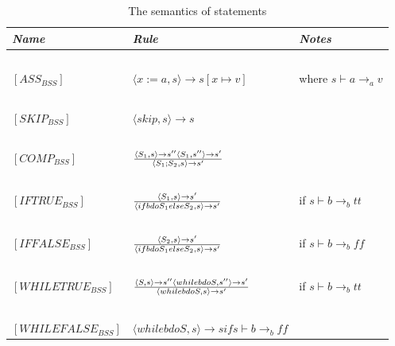 \begin{table}[h]
	\begin{tabular}{|l|l|l|}
	\hline
	\emph{Name}			& \emph{Rule}																															& \emph{Notes} \\ \hline
			~			&															~																			& ~ \\
	$[ASS_{BSS}]$		& $\langle x := a,s \rangle \rightarrow s[x \mapsto v]$																					& where $s \vdash a \rightarrow_{a} v$ \\
			~			&															~																			& ~ \\
	$[SKIP_{BSS}]$		& $\langle skip, s \rangle \rightarrow s$																								& ~ \\
			~			&															~																			& ~ \\
	$[COMP_{BSS}]$		& $\langle S_{1},s \rangle \rightarrow s''  \langle S_{1},s'' \rangle \rightarrow s'  \over \langle S_{1};S_{2},s \rangle \rightarrow s'$	& ~ \\
			~			&															~																			& ~ \\
	$[IFTRUE_{BSS}]$	& $\langle S_{1},s \rangle \rightarrow s' \over \langle if b do S_{1} else S_{2},s \rangle \rightarrow s'	$							& if $s \vdash b \rightarrow_{b} tt$\\
			~			&															~																			& ~ \\
	$[IFFALSE_{BSS}]$	& $\langle S_{2},s \rangle \rightarrow s' \over \langle if b do S_{1} else S_{2},s \rangle \rightarrow s'	$							& if $s \vdash b \rightarrow_{b} ff$\\
			~			&															~																			& ~ \\
	$[WHILETRUE_{BSS}]$	& $\langle S,s \rangle \rightarrow s'' \langle while b do S,s'' \rangle \rightarrow s' \over \langle while b do S,s \rangle \rightarrow s'	$ & if $s \vdash b \rightarrow_{b} tt$\\
			~			&															~																			& ~ \\
	$[WHILEFALSE_{BSS}]$& $\langle while b do S,s \rangle \rightarrow s if s \vdash b \rightarrow_{b} ff $														& ~ \\
	\hline
	\end{tabular}
	\label{tab:semantics_statements}
	\caption{The semantics of statements}
\end{table}